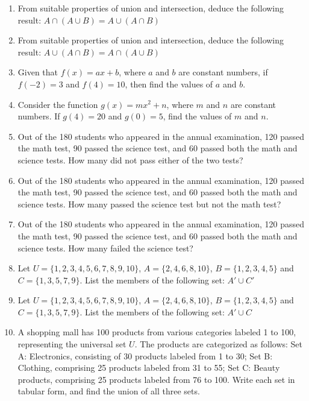 \documentclass[11pt]{article}
\begin{document}
\begin{enumerate}[leftmargin=1.8cm,start=99]

\item From suitable properties of union and intersection, deduce the following result: $A\cap(A\cup B)=A\cup(A\cap B)$

\item From suitable properties of union and intersection, deduce the following result: $A\cup(A\cap B)=A\cap(A\cup B)$

\item Given that $f(x)=ax+b$, where $a$ and $b$ are constant numbers, if $f(-2)=3$ and $f(4)=10$, then find the values of $a$ and $b$.

\item Consider the function $g(x)=mx^2+n$, where $m$ and $n$ are constant numbers. If $g(4)=20$ and $g(0)=5$, find the values of $m$ and $n$.

\item Out of the 180 students who appeared in the annual examination, 120 passed the math test, 90 passed the science test, and 60 passed both the math and science tests. How many did not pass either of the two tests?

\item Out of the 180 students who appeared in the annual examination, 120 passed the math test, 90 passed the science test, and 60 passed both the math and science tests. How many passed the science test but not the math test?

\item Out of the 180 students who appeared in the annual examination, 120 passed the math test, 90 passed the science test, and 60 passed both the math and science tests. How many failed the science test?

\item Let $U=\{1,2,3,4,5,6,7,8,9,10\}$, $A=\{2,4,6,8,10\}$, $B=\{1,2,3,4,5\}$ and $C=\{1,3,5,7,9\}$. List the members of the following set: $A'\cup C'$

\item Let $U=\{1,2,3,4,5,6,7,8,9,10\}$, $A=\{2,4,6,8,10\}$, $B=\{1,2,3,4,5\}$ and $C=\{1,3,5,7,9\}$. List the members of the following set: $A'\cup C$

\item A shopping mall has 100 products from various categories labeled 1 to 100, representing the universal set $U$. The products are categorized as follows: Set A: Electronics, consisting of 30 products labeled from 1 to 30; Set B: Clothing, comprising 25 products labeled from 31 to 55; Set C: Beauty products, comprising 25 products labeled from 76 to 100. Write each set in tabular form, and find the union of all three sets.


\end{enumerate}
\end{document}
